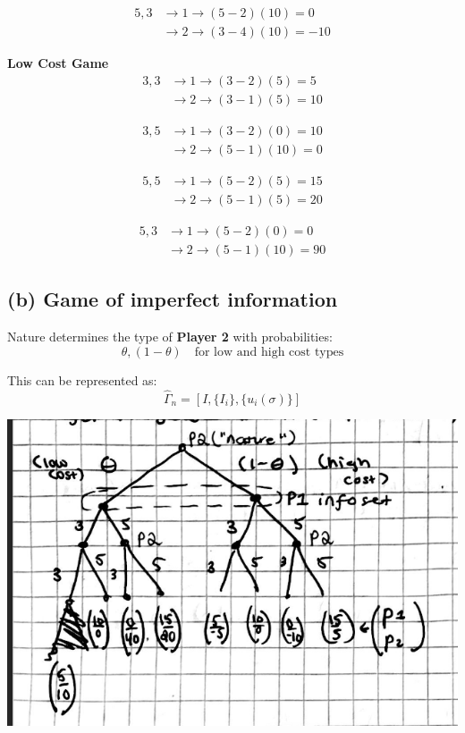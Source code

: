 \documentclass{article}
\begin{document}
\begin{align*}
    5,3 &\to 1 \to (5 - 2)(10) = 0 \\
    &\to 2 \to (3 - 4)(10) = -10
\end{align*}

\textbf{Low Cost Game}
\begin{align*}
    3,3 &\to 1 \to (3 - 2)(5) = 5 \\
    &\to 2 \to (3 - 1)(5) = 10
\end{align*}

\begin{align*}
    3,5 &\to 1 \to (3 - 2)(0) = 10 \\
    &\to 2 \to (5 - 1)(10) = 0
\end{align*}

\begin{align*}
    5,5 &\to 1 \to (5 - 2)(5) = 15 \\
    &\to 2 \to (5 - 1)(5) = 20
\end{align*}

\begin{align*}
    5,3 &\to 1 \to (5 - 2)(0) = 0 \\
    &\to 2 \to (5 - 1)(10) = 90
\end{align*}

\subsection*{(b) Game of imperfect information}
Nature determines the type of \textbf{Player 2} with probabilities:
\[
\theta, (1 - \theta) \quad \text{for low and high cost types}
\]

This can be represented as:
\[
\hat{\Gamma}_n = \left[ I, \{ I_i \}, \{ u_i(\sigma) \} \right]
\]

\begin{center}
 \includegraphics[width=.75\linewidth]{images/Screenshot 2025-03-02 at 19.07.23.png} 
\end{center}
\end{document}
